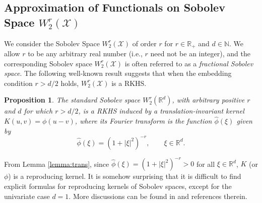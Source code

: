 \documentclass{article}
\def\NN{\mathbb N}
\def\RR{\mathbb R}
\numberwithin{equation}{section}
\newtheorem{proposition}[theorem]{Proposition}
\begin{document}
\subsection{Approximation of Functionals on Sobolev Space $W^r_2(\mathcal{X})$}\label{Sobolev}
We consider the Sobolev Space $W^r_2(\mathcal{X})$ of order $r$  for $r\in \RR_+$ and $d\in \NN$. 
We allow $r$ to be any arbitrary real number (i.e., $r$ need not be an integer), and the corresponding Sobolev space $W^r_2(\mathcal{X})$ is often referred to as a {\it fractional Sobolev space}. 
The following well-known result suggests that when the embedding condition $r>d/2$ holds, $W^r_2(\mathcal{X})$ is a RKHS. 
\begin{proposition}
    The standard Sobolev space $W^r_2(\RR^d)$, with arbitrary positive  $r$ and $d$ for which $r>d/2$, is a RKHS induced by a translation-invariant  kernel $K(u,v) = \phi (u-v)$, where its Fourier transform is the function $\widehat{\phi}(\xi)$ given by
\begin{equation}\label{fourier_Sobolev}
    \widehat \phi (\xi) = (1+|\xi|^2)^{-r}, \qquad  \xi \in \RR^d.
\end{equation}
\end{proposition}

From Lemma \ref{lemma:trans}, since $\widehat \phi(\xi) = (1+|\xi|^2)^{-r} >0$ for all $\xi \in \RR^d$, $K$ (or $\phi$) is a reproducing kernel.
It is somehow surprising that it is difficult to find explicit formulas for reproducing kernels of Sobolev spaces, except for the univariate case $d=1$. 
More discussions can be found in \citep{novak2018reproducing} and references therein. 
\end{document}

